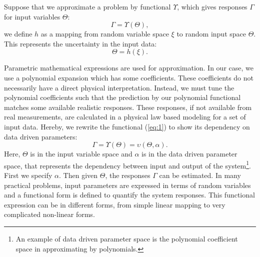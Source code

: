 Suppose that we approximate a problem by functional $\Upsilon$, which gives responses $\Gamma$ for input variables $\Theta$:
%
\begin{equation}
  \Gamma=\Upsilon(\Theta),
  \label{eq:1}
\end{equation} 
%
we define $h$ as a mapping from random variable space $\xi$ to random input space $\Theta$. This represents the uncertainty in the input data:
%
\begin{equation}
  \Theta=h(\xi).
  \label{eq:rand}
\end{equation}
%

Parametric mathematical expressions are used for approximation. In our case, we use a polynomial expansion which has some coefficients. These coefficients do not necessarily have a direct physical interpretation. Instead, we must tune the polynomial coefficients such that the prediction by our polynomial functional matches some available realistic responses. These responses, if not available from real measurements, are calculated in a physical law based modeling for a set of input data. Hereby, we rewrite the functional (\ref{eq:1}) to show its dependency on data driven parameters:
%
\begin{equation}
  \Gamma=\Upsilon(\Theta)=\upsilon(\Theta,\alpha).
  \label{eq:parm}
\end{equation}
%
Here, $\Theta$ is in the input variable space and $\alpha$ is in the data driven parameter space, that represents the dependency between input and output of the system\footnote{An example of data driven parameter space is the polynomial coefficient space in approximating by polynomials.}. First we specify $\alpha$. Then given $\Theta$, the responses $\Gamma$ can be estimated. In many practical problems, input parameters are expressed in terms of random variables and a functional form is defined to quantify the system responses. This functional expression can be in different forms, from simple linear mapping to very complicated non-linear forms. 

